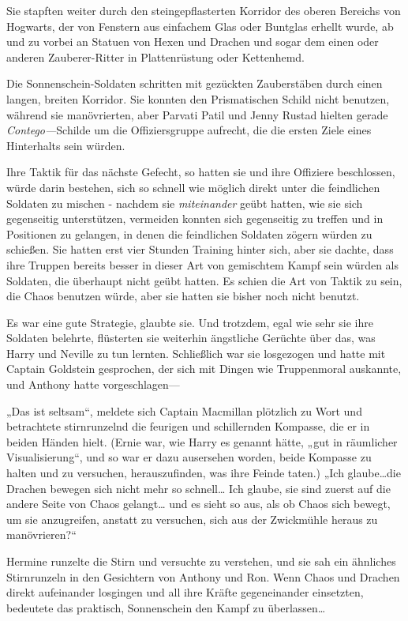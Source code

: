{Sie stapften weiter durch den steingepflasterten Korridor des oberen Bereichs von Hogwarts, der von Fenstern aus einfachem Glas oder Buntglas erhellt wurde, ab und zu vorbei an Statuen von Hexen und Drachen und sogar dem einen oder anderen Zauberer-Ritter in Plattenrüstung oder Kettenhemd.

Die Sonnenschein-Soldaten schritten mit gezückten Zauberstäben durch einen langen, breiten Korridor. Sie konnten den Prismatischen Schild nicht benutzen, während sie manövrierten, aber Parvati Patil und Jenny Rustad hielten gerade \emph{Contego—}Schilde um die Offiziersgruppe aufrecht, die die ersten Ziele eines Hinterhalts sein würden.

Ihre Taktik für das nächste Gefecht, so hatten sie und ihre Offiziere beschlossen, würde darin bestehen, sich so schnell wie möglich direkt unter die feindlichen Soldaten zu mischen - nachdem sie \emph{miteinander} geübt hatten, wie sie sich gegenseitig unterstützen, vermeiden konnten sich gegenseitig zu treffen und in Positionen zu gelangen, in denen die feindlichen Soldaten zögern würden zu schießen. Sie hatten erst vier Stunden Training hinter sich, aber sie dachte, dass ihre Truppen bereits besser in dieser Art von gemischtem Kampf sein würden als Soldaten, die überhaupt nicht geübt hatten. Es schien die Art von Taktik zu sein, die Chaos benutzen würde, aber sie hatten sie bisher noch nicht benutzt.

Es war eine gute Strategie, glaubte sie. Und trotzdem, egal wie sehr sie ihre Soldaten belehrte, flüsterten sie weiterhin ängstliche Gerüchte über das, was Harry und Neville zu tun lernten. Schließlich war sie losgezogen und hatte mit Captain Goldstein gesprochen, der sich mit Dingen wie Truppenmoral auskannte, und Anthony hatte vorgeschlagen—

„Das ist seltsam“, meldete sich Captain Macmillan plötzlich zu Wort und betrachtete stirnrunzelnd die feurigen und schillernden Kompasse, die er in beiden Händen hielt. (Ernie war, wie Harry es genannt hätte, „gut in räumlicher Visualisierung“, und so war er dazu ausersehen worden, beide Kompasse zu halten und zu versuchen, herauszufinden, was ihre Feinde taten.) „Ich glaube…die Drachen bewegen sich nicht mehr so schnell… Ich glaube, sie sind zuerst auf die andere Seite von Chaos gelangt… und es sieht so aus, als ob Chaos sich bewegt, um sie anzugreifen, anstatt zu versuchen, sich aus der Zwickmühle heraus zu manövrieren?“

Hermine runzelte die Stirn und versuchte zu verstehen, und sie sah ein ähnliches Stirnrunzeln in den Gesichtern von Anthony und Ron. Wenn Chaos und Drachen direkt aufeinander losgingen und all ihre Kräfte gegeneinander einsetzten, bedeutete das praktisch, Sonnenschein den Kampf zu überlassen…

}
